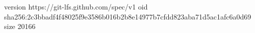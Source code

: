 version https://git-lfs.github.com/spec/v1
oid sha256:2c3bbadf4f48025f9e3586b016b2b8e14977b7cfdd823aba71d5ac1afc6a0d69
size 20166
